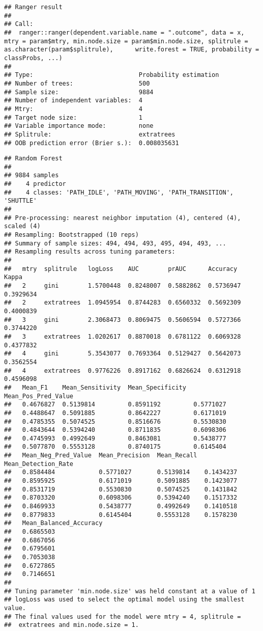 \documentclass[]{article}
\begin{document}
\begin{verbatim}
## Ranger result
## 
## Call:
##  ranger::ranger(dependent.variable.name = ".outcome", data = x,      mtry = param$mtry, min.node.size = param$min.node.size, splitrule = as.character(param$splitrule),      write.forest = TRUE, probability = classProbs, ...) 
## 
## Type:                             Probability estimation 
## Number of trees:                  500 
## Sample size:                      9884 
## Number of independent variables:  4 
## Mtry:                             4 
## Target node size:                 1 
## Variable importance mode:         none 
## Splitrule:                        extratrees 
## OOB prediction error (Brier s.):  0.008035631
\end{verbatim}

\begin{verbatim}
## Random Forest 
## 
## 9884 samples
##    4 predictor
##    4 classes: 'PATH_IDLE', 'PATH_MOVING', 'PATH_TRANSITION', 'SHUTTLE' 
## 
## Pre-processing: nearest neighbor imputation (4), centered (4), scaled (4) 
## Resampling: Bootstrapped (10 reps) 
## Summary of sample sizes: 494, 494, 493, 495, 494, 493, ... 
## Resampling results across tuning parameters:
## 
##   mtry  splitrule   logLoss    AUC        prAUC      Accuracy   Kappa    
##   2     gini        1.5700448  0.8248007  0.5882862  0.5736947  0.3929634
##   2     extratrees  1.0945954  0.8744283  0.6560332  0.5692309  0.4000839
##   3     gini        2.3068473  0.8069475  0.5606594  0.5727366  0.3744220
##   3     extratrees  1.0202617  0.8870018  0.6781122  0.6069328  0.4377832
##   4     gini        5.3543077  0.7693364  0.5129427  0.5642073  0.3562554
##   4     extratrees  0.9776226  0.8917162  0.6826624  0.6312918  0.4596098
##   Mean_F1    Mean_Sensitivity  Mean_Specificity  Mean_Pos_Pred_Value
##   0.4676827  0.5139814         0.8591192         0.5771027          
##   0.4488647  0.5091885         0.8642227         0.6171019          
##   0.4785355  0.5074525         0.8516676         0.5530830          
##   0.4843644  0.5394240         0.8711835         0.6098306          
##   0.4745993  0.4992649         0.8463081         0.5438777          
##   0.5077870  0.5553128         0.8740175         0.6145404          
##   Mean_Neg_Pred_Value  Mean_Precision  Mean_Recall  Mean_Detection_Rate
##   0.8584484            0.5771027       0.5139814    0.1434237          
##   0.8595925            0.6171019       0.5091885    0.1423077          
##   0.8531719            0.5530830       0.5074525    0.1431842          
##   0.8703320            0.6098306       0.5394240    0.1517332          
##   0.8469933            0.5438777       0.4992649    0.1410518          
##   0.8779833            0.6145404       0.5553128    0.1578230          
##   Mean_Balanced_Accuracy
##   0.6865503             
##   0.6867056             
##   0.6795601             
##   0.7053038             
##   0.6727865             
##   0.7146651             
## 
## Tuning parameter 'min.node.size' was held constant at a value of 1
## logLoss was used to select the optimal model using the smallest value.
## The final values used for the model were mtry = 4, splitrule =
##  extratrees and min.node.size = 1.
\end{verbatim}
\end{document}
